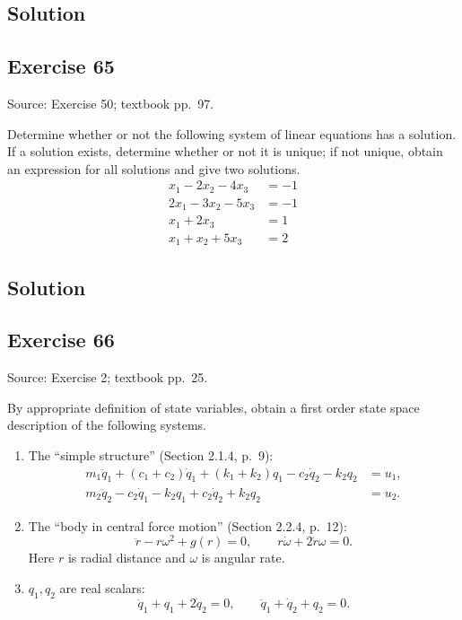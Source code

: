 \documentclass[12pt,a4paper]{article}
\newlength{\questionroom}
\newenvironment{questionprompt}{%
  \begin{lrbox}{\questionbox}\begin{minipage}{\linewidth}%
}{%
  \end{minipage}\end{lrbox}%
  \setlength{\questionroom}{\dimexpr\ht\questionbox+\dp\questionbox+5.2cm\relax}%
  \ifdim\questionroom>\textheight\setlength{\questionroom}{\textheight}\fi
  \Needspace{\questionroom}%
  \noindent\usebox{\questionbox}\par
}
\begin{document}
\subsection*{Solution}
\vspace{3.5cm}


\begin{questionprompt}
\section*{Exercise 65}
\label{practice:65}
{\small Source: Exercise 50; textbook pp.~97.}\par
Determine whether or not the following system of linear equations has a solution. If a solution exists, determine whether or not it is unique; if not unique, obtain an expression for all solutions and give two solutions.
\begin{align*}x_1-2x_2-4x_3&=-1\\2x_1-3x_2-5x_3&=-1\\x_1+2x_3&=1\\x_1+x_2+5x_3&=2\end{align*}
\end{questionprompt}
\subsection*{Solution}
\vspace{3.5cm}


\begin{questionprompt}
\section*{Exercise 66}
\label{practice:66}
{\small Source: Exercise 2; textbook pp.~25.}\par
By appropriate definition of state variables, obtain a first order state space description of the following systems.
\begin{enumerate}[label=(\roman*)]
\item The ``simple structure'' (Section 2.1.4, p.~9):
\begin{align*}
m_1\ddot q_1+(c_1+c_2)\dot q_1+(k_1+k_2)q_1-c_2\dot q_2-k_2q_2&=u_1,\\
m_2\ddot q_2-c_2\dot q_1-k_2q_1+c_2\dot q_2+k_2q_2&=u_2.
\end{align*}
\item The ``body in central force motion'' (Section 2.2.4, p.~12):
\[\ddot r-r\omega^2+g(r)=0,\qquad r\dot\omega+2\dot r\omega=0.\]
Here $r$ is radial distance and $\omega$ is angular rate.
\item $q_1,q_2$ are real scalars:
\[\ddot q_1+q_1+2\dot q_2=0,\qquad \ddot q_1+\dot q_2+q_2=0.\]
\end{enumerate}
\end{questionprompt}
\end{document}
